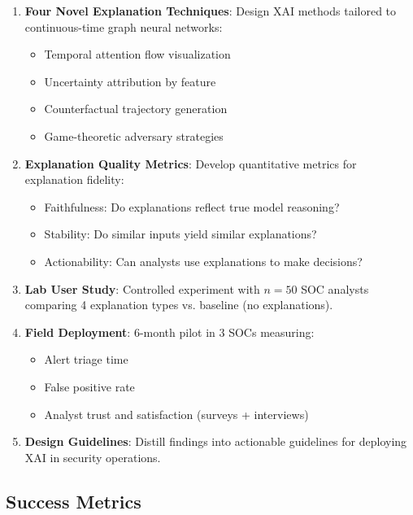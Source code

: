 \documentclass[11pt]{article}
\begin{document}
\begin{enumerate}[label=\textbf{O\arabic*.},leftmargin=*]
    \item \textbf{Four Novel Explanation Techniques}: Design XAI methods tailored to continuous-time graph neural networks:
    \begin{itemize}
        \item Temporal attention flow visualization
        \item Uncertainty attribution by feature
        \item Counterfactual trajectory generation
        \item Game-theoretic adversary strategies
    \end{itemize}

    \item \textbf{Explanation Quality Metrics}: Develop quantitative metrics for explanation fidelity:
    \begin{itemize}
        \item Faithfulness: Do explanations reflect true model reasoning?
        \item Stability: Do similar inputs yield similar explanations?
        \item Actionability: Can analysts use explanations to make decisions?
    \end{itemize}

    \item \textbf{Lab User Study}: Controlled experiment with $n = 50$ SOC analysts comparing 4 explanation types vs. baseline (no explanations).

    \item \textbf{Field Deployment}: 6-month pilot in 3 SOCs measuring:
    \begin{itemize}
        \item Alert triage time
        \item False positive rate
        \item Analyst trust and satisfaction (surveys + interviews)
    \end{itemize}

    \item \textbf{Design Guidelines}: Distill findings into actionable guidelines for deploying XAI in security operations.
\end{enumerate}

\subsection{Success Metrics}
\end{document}
